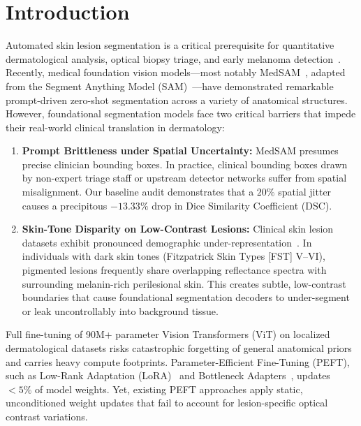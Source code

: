 \documentclass[runningheads]{llncs}
\begin{document}
\section{Introduction}
Automated skin lesion segmentation is a critical prerequisite for quantitative dermatological analysis, optical biopsy triage, and early melanoma detection~\cite{codella2018skin,tschandl2018ham10000}. Recently, medical foundation vision models---most notably MedSAM~\cite{ma2024segment}, adapted from the Segment Anything Model (SAM)~\cite{kirillov2023segment}---have demonstrated remarkable prompt-driven zero-shot segmentation across a variety of anatomical structures. However, foundational segmentation models face two critical barriers that impede their real-world clinical translation in dermatology:
\begin{enumerate}
    \item \textbf{Prompt Brittleness under Spatial Uncertainty:} MedSAM presumes precise clinician bounding boxes. In practice, clinical bounding boxes drawn by non-expert triage staff or upstream detector networks suffer from spatial misalignment. Our baseline audit demonstrates that a $20\%$ spatial jitter causes a precipitous $-13.33\%$ drop in Dice Similarity Coefficient (DSC).
    \item \textbf{Skin-Tone Disparity on Low-Contrast Lesions:} Clinical skin lesion datasets exhibit pronounced demographic under-representation~\cite{daneshjou2022disparities,groh2021evaluating,kinyanjui2020fairness}. In individuals with dark skin tones (Fitzpatrick Skin Types [FST] V--VI), pigmented lesions frequently share overlapping reflectance spectra with surrounding melanin-rich perilesional skin. This creates subtle, low-contrast boundaries that cause foundational segmentation decoders to under-segment or leak uncontrollably into background tissue.
\end{enumerate}

Full fine-tuning of 90M+ parameter Vision Transformers (ViT) on localized dermatological datasets risks catastrophic forgetting of general anatomical priors and carries heavy compute footprints. Parameter-Efficient Fine-Tuning (PEFT), such as Low-Rank Adaptation (LoRA)~\cite{hu2021lora} and Bottleneck Adapters~\cite{houlsby2019parameter}, updates $<5\%$ of model weights. Yet, existing PEFT approaches apply static, unconditioned weight updates that fail to account for lesion-specific optical contrast variations.
\end{document}
